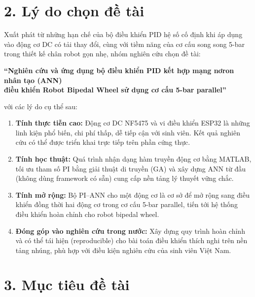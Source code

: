 \section*{2. Lý do chọn đề tài}

Xuất phát từ những hạn chế của bộ điều khiển PID hệ số cố định khi áp dụng vào
động cơ DC có tải thay đổi, cùng với tiềm năng của cơ cấu song song 5-bar trong thiết
kế chân robot gọn nhẹ, nhóm nghiên cứu chọn đề tài:

\begin{center}
    \textbf{``Nghiên cứu và ứng dụng bộ điều khiển PID kết hợp mạng nơron nhân tạo (ANN)\\
    điều khiển Robot Bipedal Wheel sử dụng cơ cấu 5-bar parallel''}
\end{center}

với các lý do cụ thể sau:

\begin{enumerate}[leftmargin=1.5cm, label=\arabic*.]
    \item \textbf{Tính thực tiễn cao:} Động cơ DC NF5475 và vi điều khiển ESP32 là
    những linh kiện phổ biến, chi phí thấp, dễ tiếp cận với sinh viên. Kết quả nghiên
    cứu có thể được triển khai trực tiếp trên phần cứng thực.

    \item \textbf{Tính học thuật:} Quá trình nhận dạng hàm truyền động cơ bằng
    MATLAB, tối ưu tham số PI bằng giải thuật di truyền (GA) và xây dựng ANN từ đầu
    (không dùng framework có sẵn) cung cấp nền tảng lý thuyết vững chắc.

    \item \textbf{Tính mở rộng:} Bộ PI--ANN cho một động cơ là cơ sở để mở rộng
    sang điều khiển đồng thời hai động cơ trong cơ cấu 5-bar parallel, tiến tới hệ thống
    điều khiển hoàn chỉnh cho robot bipedal wheel.

    \item \textbf{Đóng góp vào nghiên cứu trong nước:} Xây dựng quy trình hoàn chỉnh
    và có thể tái hiện (reproducible) cho bài toán điều khiển thích nghi trên nền tảng
    nhúng, phù hợp với điều kiện nghiên cứu của sinh viên Việt Nam.
\end{enumerate}


\section*{3. Mục tiêu đề tài}

